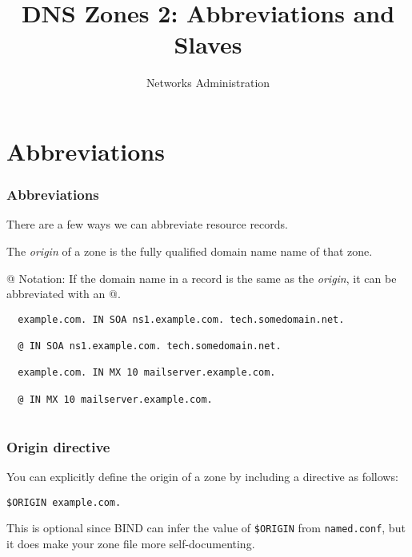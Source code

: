 \documentclass[10pt]{beamer}
\title{DNS Zones 2: Abbreviations and Slaves}
\author[IN715]{Networks Administration}
\institute[Otago Polytechnic]{
  Otago Polytechnic \\
  Dunedin, New Zealand \\
}
\date{}
\begin{document}
\begin{frame}[plain]
  \titlepage
\end{frame}


\section{Abbreviations}

\begin{frame}[fragile]
  \frametitle{Abbreviations}
 There are a few ways we can abbreviate resource records.
 
 The \emph{origin} of a zone is the fully qualified domain name name of that 
 zone. 

 @ Notation: If the domain name in a record is the same as the 
 \emph{origin}, it can be abbreviated with an @.
 \begin{verbatim}
  example.com. IN SOA ns1.example.com. tech.somedomain.net. 
 
  @ IN SOA ns1.example.com. tech.somedomain.net.
    
  example.com. IN MX 10 mailserver.example.com.
   
  @ IN MX 10 mailserver.example.com.
   
 \end{verbatim}

\end{frame}

\begin{frame}
	\frametitle{Origin directive}
	
	You can explicitly define the origin of a zone by including 
	a directive as follows:
	\vspace{5mm}
	
	\texttt{\$ORIGIN example.com.}
	\vspace{5mm}
	
	This is optional since BIND can infer the value of \texttt{\$ORIGIN} 
	from \texttt{named.conf}, but it does make your zone file more self-documenting.
\end{frame}
\end{document}
